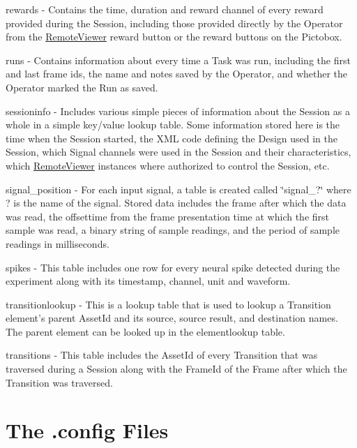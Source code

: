\begin{DoxyItemize}
\item rewards -\/ Contains the time, duration and reward channel of every reward provided during the Session, including those provided directly by the Operator from the \hyperlink{class_remote_viewer}{Remote\-Viewer} reward button or the reward buttons on the Pictobox.
\item runs -\/ Contains information about every time a Task was run, including the first and last frame ids, the name and notes saved by the Operator, and whether the Operator marked the Run as saved.
\item sessioninfo -\/ Includes various simple pieces of information about the Session as a whole in a simple key/value lookup table. Some information stored here is the time when the Session started, the X\-M\-L code defining the Design used in the Session, which Signal channels were used in the Session and their characteristics, which \hyperlink{class_remote_viewer}{Remote\-Viewer} instances where authorized to control the Session, etc.
\item signal\-\_\-position -\/ For each input signal, a table is created called \char`\"{}signal\-\_\-?\char`\"{} where ? is the name of the signal. Stored data includes the frame after which the data was read, the offsettime from the frame presentation time at which the first sample was read, a binary string of sample readings, and the period of sample readings in milliseconds.
\item spikes -\/ This table includes one row for every neural spike detected during the experiment along with its timestamp, channel, unit and waveform.
\item transitionlookup -\/ This is a lookup table that is used to lookup a Transition element's parent Asset\-Id and its source, source result, and destination names. The parent element can be looked up in the elementlookup table.
\item transitions -\/ This table includes the Asset\-Id of every Transition that was traversed during a Session along with the Frame\-Id of the Frame after which the Transition was traversed. 
\end{DoxyItemize}\hypertarget{user_files_config_file}{}\section{The .\-config Files}\label{user_files_config_file}
